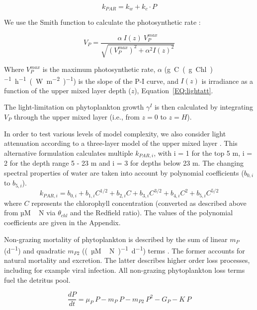 \documentclass[journal abbreviation, manuscript]{copernicus}
\begin{document}
\begin{equation}
    k_{PAR} = k_w + k_c \cdot P
    \label{EQ:beerslaw}
\end{equation}

We use the Smith function to calculate the photosynthetic rate \citep{Anderson1993APhotosynthesis}:

\begin{equation}
    V_P = \frac{\alpha ~ I(z) ~ V_P^{max}}{\sqrt{(V_P^{max})^2 + \alpha^2 I(z)^2}}
\end{equation}

Where $V_P^{max}$ is the maximum photosynthetic rate, $\alpha$ (\unit{g C (g Chl)^{-1} h^{-1} (W m^{-2})^{-1}}) is the slope of the P-I curve, and $I(z)$ is irradiance as a function of the upper mixed layer depth ($z$), Equation~\ref{EQ:lightatt}.

The light-limitation on phytoplankton growth $\gamma^{I}$ is then calculated by integrating $V_P$ through the upper mixed layer (i.e., from $z=0$ to $z=H$).

In order to test various levels of model complexity, we also consider light attenuation according to a three-layer model of the upper mixed layer \citep{Anderson1993APhotosynthesis}. This alternative formulation calculates multiple $k_{PAR, i}$, with i = 1 for the top 5 \unit{m}, i = 2 for the depth range 5 - 23 \unit{m} and i = 3 for depths below 23 \unit{m}. The changing spectral properties of water are taken into account by polynomial coefficients ($b_{0,i}$ to $b_{5,i}$).
\begin{equation}
    k_{PAR, i} = b_{0,i} + b_{1,i} C^{1/2} + b_{2,i} C + b_{3,i} C^{3/2} + b_{4,i} C^2 + b_{5,i} C^{5/2}
    \label{EQ:piecewiselight}
\end{equation}
where $C$ represents the chlorophyll concentration (converted as described above from \unit{µM\,N} via $\theta_{chl}$ and the Redfield ratio). The values of the polynomial coefficients are given in the Appendix.

Non-grazing mortality of phytoplankton is described by the sum of linear $m_P$ (\unit{d^{-1}}) and quadratic $m_{P2}$ (\unit{(µM\,N)^{-1} d^{−1}}) terms \citep{Yool2011Medusa-1.0:Domain}. The former accounts for natural mortality and excretion. The latter describes higher order loss processes, including for example viral infection. All non-grazing phytoplankton loss terms fuel the detritus pool.

\begin{equation}
    \label{Eq:EmpowerPhyto}
    \frac{d P}{d t} =
    \mu_{P} \ P  %
    - m_P \ P %
    - m_{P2} \ P^2 %
    - G_P %
    - K \ P %
\end{equation}
\end{document}
